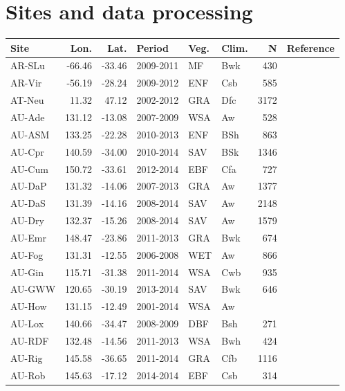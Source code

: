 \documentclass{myreport}
\begin{document}
\clearpage


\section{Sites and data processing}

\begin{longtable}{lrrlllrl}
  \hline
 Site & Lon. & Lat. & Period & Veg. & Clim. & N & Reference \\ 
  \hline
 AR-SLu & -66.46 & -33.46 & 2009-2011 & MF & Bwk & 430 & \cite{AR-SLu} \\ 
 AR-Vir & -56.19 & -28.24 & 2009-2012 & ENF & Csb & 585 & \cite{AR-Vir} \\ 
 AT-Neu & 11.32 & 47.12 & 2002-2012 & GRA & Dfc & 3172 & \cite{AT-Neu} \\ 
 AU-Ade & 131.12 & -13.08 & 2007-2009 & WSA & Aw & 528 & \cite{AU-Ade} \\ 
 AU-ASM & 133.25 & -22.28 & 2010-2013 & ENF & BSh & 863 & \cite{AU-ASM} \\ 
 AU-Cpr & 140.59 & -34.00 & 2010-2014 & SAV & BSk & 1346 & \cite{AU-Cpr} \\ 
 AU-Cum & 150.72 & -33.61 & 2012-2014 & EBF & Cfa & 727 & \cite{AU-Cum} \\ 
 AU-DaP & 131.32 & -14.06 & 2007-2013 & GRA & Aw & 1377 & \cite{AU-DaP} \\ 
 AU-DaS & 131.39 & -14.16 & 2008-2014 & SAV & Aw & 2148 & \cite{AU-DaS} \\ 
 AU-Dry & 132.37 & -15.26 & 2008-2014 & SAV & Aw & 1579 & \cite{AU-Dry} \\ 
 AU-Emr & 148.47 & -23.86 & 2011-2013 & GRA & Bwk & 674 & \cite{AU-Emr} \\ 
 AU-Fog & 131.31 & -12.55 & 2006-2008 & WET & Aw & 866 & \cite{AU-Fog} \\ 
 AU-Gin & 115.71 & -31.38 & 2011-2014 & WSA & Cwb & 935 & \cite{AU-Gin} \\ 
 AU-GWW & 120.65 & -30.19 & 2013-2014 & SAV & Bwk & 646 & \cite{AU-GWW} \\ 
 AU-How & 131.15 & -12.49 & 2001-2014 & WSA & Aw &  & \cite{AU-How} \\ 
 AU-Lox & 140.66 & -34.47 & 2008-2009 & DBF & Bsh & 271 & \cite{AU-Lox} \\ 
 AU-RDF & 132.48 & -14.56 & 2011-2013 & WSA & Bwh & 424 & \cite{AU-RDF} \\ 
 AU-Rig & 145.58 & -36.65 & 2011-2014 & GRA & Cfb & 1116 & \cite{AU-Rig} \\ 
 AU-Rob & 145.63 & -17.12 & 2014-2014 & EBF & Csb & 314 & \cite{AU-Rob} \\ 

\end{longtable}
\end{document}
